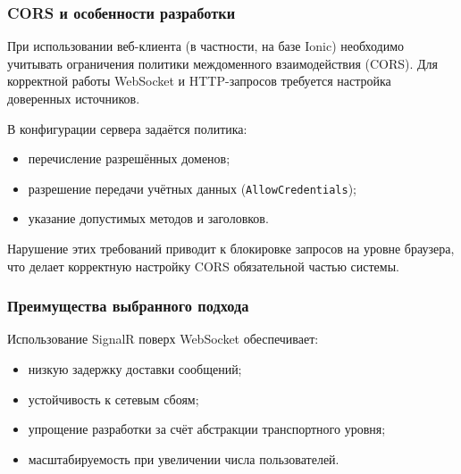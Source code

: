 \documentclass{article}
\begin{document}
\subsubsection{CORS и особенности разработки}

При использовании веб-клиента (в частности, на базе Ionic) необходимо учитывать ограничения политики междоменного взаимодействия (CORS). Для корректной работы WebSocket и HTTP-запросов требуется настройка доверенных источников.

В конфигурации сервера задаётся политика:
\begin{itemize}
\item перечисление разрешённых доменов;
\item разрешение передачи учётных данных (\texttt{AllowCredentials});
\item указание допустимых методов и заголовков.
\end{itemize}

Нарушение этих требований приводит к блокировке запросов на уровне браузера, что делает корректную настройку CORS обязательной частью системы.

\subsubsection{Преимущества выбранного подхода}

Использование SignalR поверх WebSocket обеспечивает:
\begin{itemize}
\item низкую задержку доставки сообщений;
\item устойчивость к сетевым сбоям;
\item упрощение разработки за счёт абстракции транспортного уровня;
\item масштабируемость при увеличении числа пользователей.
\end{itemize}
\end{document}
